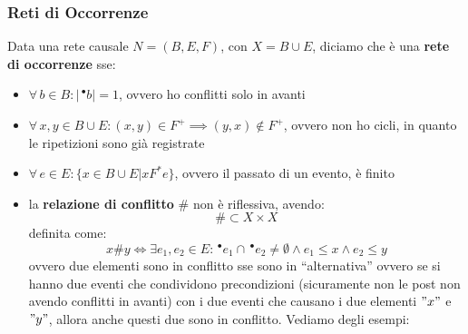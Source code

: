 \subsubsection{Reti di Occorrenze}
\begin{definizione}
  Data una rete causale $N=(B, E, F)$, con $X=B\cup E$, diciamo che è una
  \textbf{rete di occorrenze} sse:
  \begin{itemize}
    \item $\forall\, b\in B:|\,^\bullet b|=1$, ovvero ho conflitti solo in
    avanti
    \item $\forall\, x, y\in B\cup E:(x, y)\in F^+\implies (y, x)\not\in F^+$,
    ovvero non ho cicli, in quanto le ripetizioni sono già registrate
    \item $\forall\, e\in E:\{x\in B\cup E|xF^*e\}$, ovvero il passato di un
    evento, è finito 
    \item la \textbf{relazione di conflitto} $\#$ non è riflessiva, avendo:
    \[\#\subset X\times X\]
    definita come:
    \[x\# y\iff \exists e_1, e_2\in E:\,^\bullet e_1\cap \,^\bullet e_2\neq
      \emptyset \land e_1\leq x\land e_2\leq y\]
    ovvero due elementi sono in conflitto sse sono in ``alternativa'' ovvero se
    si hanno due eventi che condividono precondizioni (sicuramente non le post
    non avendo conflitti in avanti) con i due eventi che causano i due elementi
    $"x"$ e $"y"$, allora anche questi due sono in conflitto. Vediamo degli esempi:
    \begin{figure}[H]
      \centering
\end{figure}
\end{itemize}
\end{definizione}
